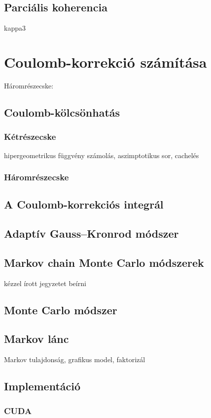 \documentclass[10pt,a4paper]{article}
\numberwithin{equation}{subsection}
\numberwithin{figure}{section}
\begin{document}
\subsection{Parciális koherencia}
kappa3

\section{Coulomb-korrekció számítása}
Háromrészecske: ~\cite{Alt:1998nr}
\subsection{Coulomb-kölcsönhatás}
\subsubsection{Kétrészecske}
hipergeometrikus függvény
számolás, aszimptotikus sor, cachelés
\subsubsection{Háromrészecske}

\subsection{A Coulomb-korrekciós integrál}

\subsection{Adaptív Gauss–Kronrod módszer}\label{sec:GK}

\subsection{Markov chain Monte Carlo módszerek}
kézzel írott jegyzetet beírni
\subsection{Monte Carlo módszer}
\subsection{Markov lánc}
Markov tulajdonság, grafikus model, faktorizál

\subsection{Implementáció}
\subsubsection{CUDA}\label{sec:CUDA}
\end{document}

